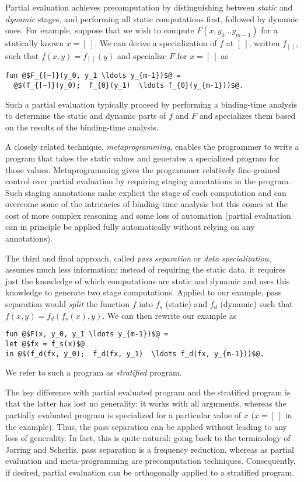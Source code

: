 Partial evaluation achieves precomputation by distinguishing between 
{\em static} and {\em dynamic} stages, and performing all static
computations first, followed by dynamic ones.  For example,
suppose that we wish to compute $F(x, y_0 \ldots y_{m-1})$ for a
statically known $x = [~]$.  We can derive a specialization of $f$ at
$[~]$, written $f_{[~]}$, such that $f(x,y) = f_{[~]}(y)$ and specialize $F$
for $x=[~]$ as
\begin{lstlisting}
fun @$F_{[~]}(y_0, y_1 \ldots y_{m-1})$@ = 
  @$(f_{[~]}(y_0);  f_{0}(y_1)  \ldots f_{0}(y_{m-1}))$@.
\end{lstlisting}
%
Such a partial evaluation typically proceed by performing a
binding-time analysis to determine the static and dynamic parts of $f$
and $F$ and specializes them based on the results of the binding-time
analysis.

A closely related technique, {\em metaprogramming}, enables the
programmer to write a program that takes the static values and
generates a specialized program for those values.  Metaprogramming
gives the programmer relatively fine-grained control over partial
evaluation by requiring staging annotations in the program.  Such
staging annotations make explicit the stage of each computation and
can overcome some of the intricacies of binding-time analysis but this
comes at the cost of more complex reasoning and some loss of
automation (partial evaluation can in principle be applied fully
automatically without relying on any annotations).

The third and final approach, called {\em pass separation} or {\em
  data specialization}, assumes much less information: instead of
requiring the static data, it requires just the knowledge of which
computations are static and dynamic and uses this knowledge to
generate two stage computations. 
%
Applied to our example, pass separation would {\em split} the function
$f$ into $f_s$ (static) and $f_d$ (dynamic) such that $f(x,y) =
f_d(f_s(x),y)$.  We can then rewrite our example as
%
\begin{lstlisting}
fun @$F(x, y_0, y_1 \ldots y_{m-1})$@ = 
let @$fx = f_s(x)$@
in @$(f_d(fx, y_0);  f_d(fx, y_1)  \ldots f_d(fx, y_{m-1}))$@.
\end{lstlisting}
We refer to such a program as {\em stratified} program.

The key difference with partial evaluated program and the stratified
program is that the latter has lost no generality: it works with all
arguments, whereas the partially evaluated program is specialized for
a particular value of $x$ ($x = [~]$ in the example).  Thus, the pass
separation can be applied without leading to any loss of generality.
In fact, this is quite natural: going back to the terminology of
Jorring and Scherlis, pass separation is a frequency reduction,
whereas as partial evaluation and meta-programming are precomputation
techniques. Consequently, if desired, partial evaluation can be
orthogonally applied to a stratified program.



